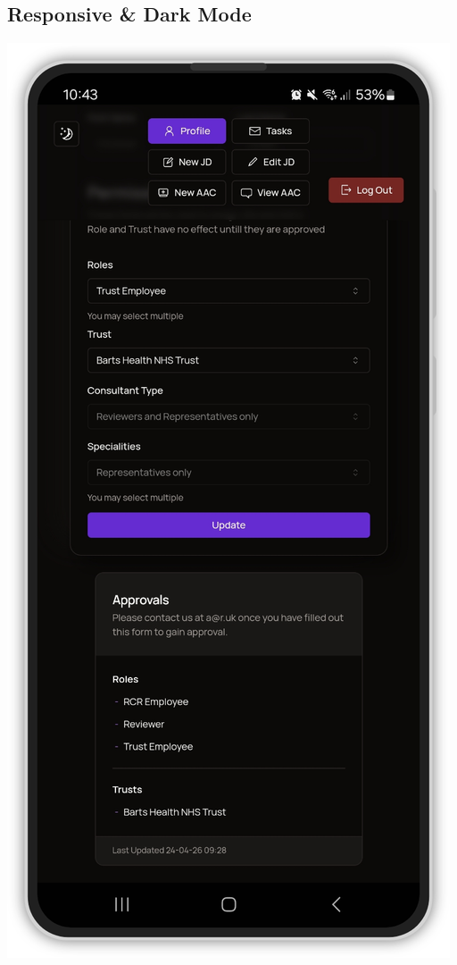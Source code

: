 \begin{appendices}
\section{Responsive \& Dark Mode} \label{app:Mobile}
\begin{center}
\includegraphics[height=0.89\textheight]{images/mobile-profile.png}
\end{center}


\end{appendices}
